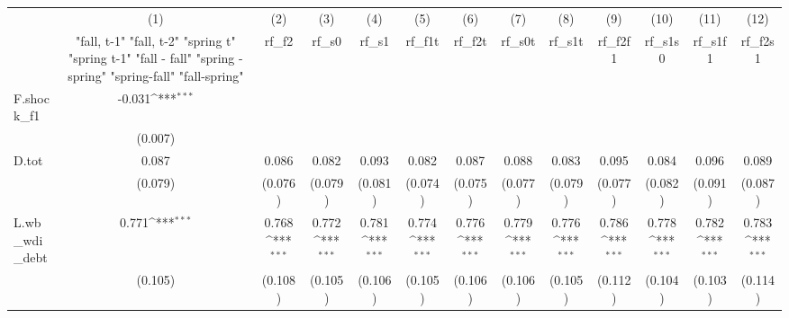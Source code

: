 {
\def\sym#1{\ifmmode^{#1}\else\(^{#1}\)\fi}
\begin{tabular}{l*{12}{c}}
\toprule
            &\multicolumn{1}{c}{(1)}&\multicolumn{1}{c}{(2)}&\multicolumn{1}{c}{(3)}&\multicolumn{1}{c}{(4)}&\multicolumn{1}{c}{(5)}&\multicolumn{1}{c}{(6)}&\multicolumn{1}{c}{(7)}&\multicolumn{1}{c}{(8)}&\multicolumn{1}{c}{(9)}&\multicolumn{1}{c}{(10)}&\multicolumn{1}{c}{(11)}&\multicolumn{1}{c}{(12)}\\
            &\multicolumn{1}{c}{  "fall, t-1" "fall, t-2" "spring t" "spring t-1"  "fall - fall" "spring - spring" "spring-fall" "fall-spring" }&\multicolumn{1}{c}{rf\_f2}&\multicolumn{1}{c}{rf\_s0}&\multicolumn{1}{c}{rf\_s1}&\multicolumn{1}{c}{rf\_f1t}&\multicolumn{1}{c}{rf\_f2t}&\multicolumn{1}{c}{rf\_s0t}&\multicolumn{1}{c}{rf\_s1t}&\multicolumn{1}{c}{rf\_f2f1}&\multicolumn{1}{c}{rf\_s1s0}&\multicolumn{1}{c}{rf\_s1f1}&\multicolumn{1}{c}{rf\_f2s1}\\
\midrule
F.shock\_f1  &      -0.031\sym{***}&                     &                     &                     &                     &                     &                     &                     &                     &                     &                     &                     \\
            &     (0.007)         &                     &                     &                     &                     &                     &                     &                     &                     &                     &                     &                     \\
\addlinespace
D.tot       &       0.087         &       0.086         &       0.082         &       0.093         &       0.082         &       0.087         &       0.088         &       0.083         &       0.095         &       0.084         &       0.096         &       0.089         \\
            &     (0.079)         &     (0.076)         &     (0.079)         &     (0.081)         &     (0.074)         &     (0.075)         &     (0.077)         &     (0.079)         &     (0.077)         &     (0.082)         &     (0.091)         &     (0.087)         \\
\addlinespace
L.wb\_wdi\_debt&       0.771\sym{***}&       0.768\sym{***}&       0.772\sym{***}&       0.781\sym{***}&       0.774\sym{***}&       0.776\sym{***}&       0.779\sym{***}&       0.776\sym{***}&       0.786\sym{***}&       0.778\sym{***}&       0.782\sym{***}&       0.783\sym{***}\\
            &     (0.105)         &     (0.108)         &     (0.105)         &     (0.106)         &     (0.105)         &     (0.106)         &     (0.106)         &     (0.105)         &     (0.112)         &     (0.104)         &     (0.103)         &     (0.114)         \\

\end{tabular}}
